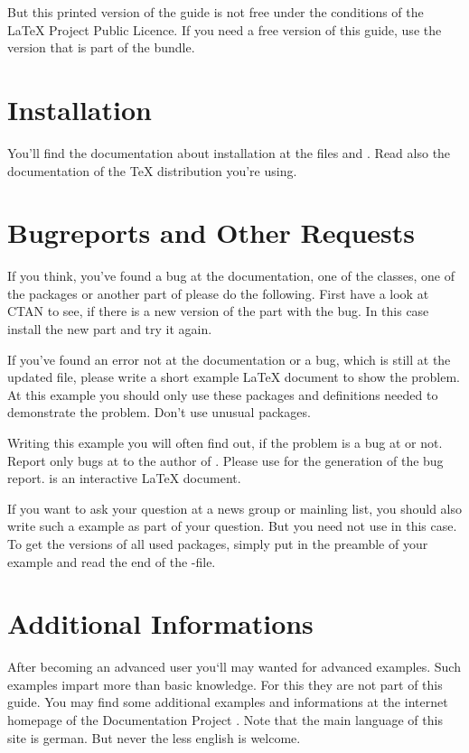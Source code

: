 %
{But this printed version of the guide is not free under the conditions of the
  LaTeX{} Project Public Licence. If you need a free version of this guide,
  use the version that is part of the \KOMAScript{} bundle.}

\section{Installation}\label{sec:introduction.installation}
You'll find the documentation about installation at the files
 and . Read also the documentation
of the \TeX{} distribution you're using.

\section{Bugreports and Other Requests}
\label{sec:introduction.errors}

If you think, you've found a bug at the documentation, one of the
\KOMAScript{} classes, one of the \KOMAScript{} packages or another
part of \KOMAScript{} please do the following. First have a look at
CTAN to see, if there is a new version of the part with the bug. In
this case install the new part and try it again.

If you've found an error not at the documentation or a bug, which is
still at the updated file, please write a short example \LaTeX{}
document to show the problem. At this example you should only use
these packages and definitions needed to demonstrate the
problem. Don't use unusual packages.

Writing this example you will often find out, if the problem is a bug
at \KOMAScript{} or not. Report only bugs at \KOMAScript{} to the
author of \KOMAScript{}. Please use  for the
generation of the bug report.  is an interactive
\LaTeX{} document.

If you want to ask your question at a news group or mainling list, you
should also write such a example as part of your question. But you
need not use  in this case. To get the versions of
all used packages, simply put  in the preamble of
your example and read the end of the -file.


\section{Additional Informations}
\label{sec:introduction.moreinfos}

After becoming an advanced user you`ll may wanted for advanced examples. Such
examples impart more than basic knowledge. For this they are not
part of this guide. You may find some additional
examples and informations at the internet homepage of the \KOMAScript{}
Documentation Project \cite{homepage}. Note that the main language of this
site is german. But never the less english is welcome.

\endinput
